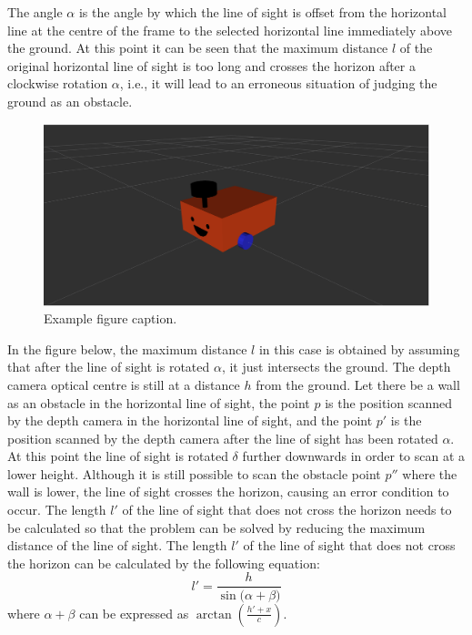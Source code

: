 The angle $\alpha$ is the angle by which the line of sight is offset from the horizontal line at the centre of the frame to the selected horizontal line immediately above the ground. At this point it can be seen that the maximum distance $l$ of the original horizontal line of sight is too long and crosses the horizon after a clockwise rotation $\alpha$, i.e., it will lead to an erroneous situation of judging the ground as an obstacle.
\begin{figure}[H]
    \centering
    \includegraphics[width=0.8\linewidth]{figs/robot.png}
    \caption{Example figure caption.}
\end{figure}
In the figure below, the maximum distance $l$ in this case is obtained by assuming that after the line of sight is rotated $\alpha$, it just intersects the ground. The depth camera optical centre is still at a distance $h$ from the ground. Let there be a wall as an obstacle in the horizontal line of sight, the point $p$ is the position scanned by the depth camera in the horizontal line of sight, and the point $p'$ is the position scanned by the depth camera after the line of sight has been rotated $\alpha$.
At this point the line of sight is rotated $\delta$ further downwards in order to scan at a lower height. Although it is still possible to scan the obstacle point $p''$ where the wall is lower, the line of sight crosses the horizon, causing an error condition to occur. The length $l'$ of the line of sight that does not cross the horizon needs to be calculated so that the problem can be solved by reducing the maximum distance of the line of sight. 
The length $l'$ of the line of sight that does not cross the horizon can be calculated by the following equation: 
\begin{equation}
    l'=\frac{h}{\sin{(\alpha+\beta})}
\end{equation}
where $\alpha+\beta$ can be expressed as $\arctan(\frac{h'+x}{c})$. 

